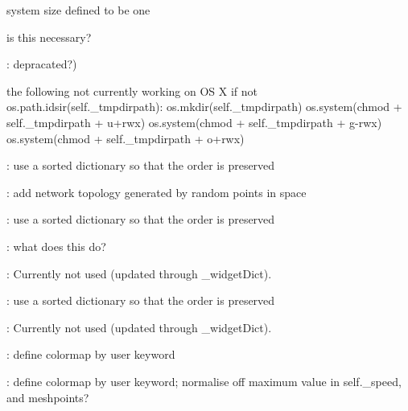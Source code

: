 \begin{DoxyRefList}
system size defined to be one  
\item[\label{todo__todo000013}%
\Hypertarget{todo__todo000013}%
Global \hyperlink{class_mu_mo_t_1_1_mu_mo_tmodel_a8ef9f9e4473f46043da1484716b18268}{Mu\+Mo\+Tmodel.\+\_\+funcs} ]is this necessary?  
\item[\label{todo__todo000003}%
\Hypertarget{todo__todo000003}%
Global \hyperlink{class_mu_mo_t_1_1_mu_mo_tmodel_accfd4bbcd94ec3ce4a064fec53921700}{Mu\+Mo\+Tmodel.\+\_\+reactants\+La\+TeX} ]\+: depracated?)  
\item[\label{todo__todo000017}%
\Hypertarget{todo__todo000017}%
Global \hyperlink{class_mu_mo_t_1_1_mu_mo_tmodel_ad2feb50403a36ab7c591c04e0cf33cc4}{Mu\+Mo\+Tmodel.\+\_\+tmpdir} ]the following not currently working on OS X if not os.\+path.\+idsir(self.\+\_\+tmpdirpath)\+: os.\+mkdir(self.\+\_\+tmpdirpath) os.\+system(\textquotesingle{}chmod\textquotesingle{} + self.\+\_\+tmpdirpath + \textquotesingle{}u+rwx\textquotesingle{}) os.\+system(\textquotesingle{}chmod\textquotesingle{} + self.\+\_\+tmpdirpath + \textquotesingle{}g-\/rwx\textquotesingle{}) os.\+system(\textquotesingle{}chmod\textquotesingle{} + self.\+\_\+tmpdirpath + \textquotesingle{}o+rwx\textquotesingle{})  
\item[\label{todo__todo000021}%
\Hypertarget{todo__todo000021}%
Global \hyperlink{class_mu_mo_t_1_1_mu_mo_tmultiagent_controller_a018864aa22d2adb0d3958fb0adbce8e2}{Mu\+Mo\+Tmultiagent\+Controller.\+\_\+progress\+Bar} ]\+: use a sorted dictionary so that the order is preserved 

\+: add network topology generated by random points in space 

\+: use a sorted dictionary so that the order is preserved  
\item[\label{todo__todo000002}%
\Hypertarget{todo__todo000002}%
Class \hyperlink{class_mu_mo_t_1_1_mu_mo_tmultiagent_view}{Mu\+Mo\+Tmultiagent\+View} ]\+: what does this do?  
\item[\label{todo__todo000041}%
\Hypertarget{todo__todo000041}%
Global \hyperlink{class_mu_mo_t_1_1_mu_mo_tmultiagent_view_a5feff4ca83ee97d6e09874496a4975d4}{Mu\+Mo\+Tmultiagent\+View.\+\_\+plot\+Type} ]\+: Currently not used (updated through \+\_\+widget\+Dict). 
\item[\label{todo__todo000020}%
\Hypertarget{todo__todo000020}%
Global \hyperlink{class_mu_mo_t_1_1_mu_mo_t_s_s_a_controller_a018864aa22d2adb0d3958fb0adbce8e2}{Mu\+Mo\+T\+S\+S\+A\+Controller.\+\_\+progress\+Bar} ]\+: use a sorted dictionary so that the order is preserved  
\item[\label{todo__todo000044}%
\Hypertarget{todo__todo000044}%
Global \hyperlink{class_mu_mo_t_1_1_mu_mo_t_s_s_a_view_a5feff4ca83ee97d6e09874496a4975d4}{Mu\+Mo\+T\+S\+S\+A\+View.\+\_\+plot\+Type} ]\+: Currently not used (updated through \+\_\+widget\+Dict). 
\item[\label{todo__todo000001}%
\Hypertarget{todo__todo000001}%
Class \hyperlink{class_mu_mo_t_1_1_mu_mo_tvector_view}{Mu\+Mo\+Tvector\+View} ]\+: define colormap by user keyword 

\+: define colormap by user keyword; normalise off maximum value in self.\+\_\+speed, and meshpoints? 
\end{DoxyRefList}